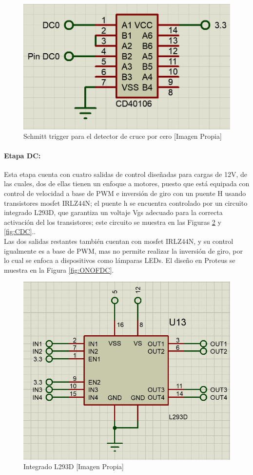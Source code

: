 		\begin{figure}[H]
			\centering
			\caption{Schmitt trigger para el detector de cruce por cero [Imagen Propia]}
			\label{fig:DC02}
			\includegraphics[width=0.5\linewidth]{Imagenes/DC02}
		\end{figure}
	
	\paragraph{Etapa DC:}
		Esta etapa cuenta con cuatro salidas de control diseñadas para cargas de 12V, de las cuales, dos de ellas tienen un enfoque a motores, puesto que está equipada con control de velocidad a base de PWM e inversión de giro con un puente H usando transistores mosfet IRLZ44N; el puente h se encuentra controlado por un circuito integrado L293D, que garantiza un voltaje Vgs adecuado para la correcta activación del los transistores; este circuito se muestra en las Figuras \ref{fig:L293D} y \ref{fig:CDC}.\cite{IRL}.\\
		
		Las dos salidas restantes también cuentan con mosfet IRLZ44N, y su control igualmente es a base de PWM, mas no permite realizar la inversión de giro, por lo cual se enfoca a dispositivos como lámparas LEDs. El diseño en Proteus se muestra en la Figura \ref{fig:ONOFDC}.\\
		
		\begin{figure}[H]
			\centering
			\caption{Integrado L293D [Imagen Propia]}
			\label{fig:L293D}
			\includegraphics[width=0.5\linewidth]{Imagenes/L293D}
		\end{figure}
		
